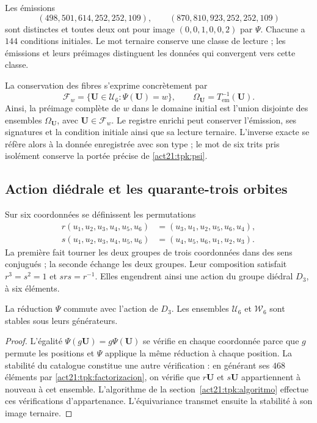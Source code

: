 \begin{example}
\label{act21:tpk:colision}
Les émissions
\[
 (498,501,614,252,252,109),\qquad
 (870,810,923,252,252,109)
\]
sont distinctes et toutes deux ont pour image \((0,0,1,0,0,2)\) par \(\Psi\).
Chacune a \(144\) conditions initiales. Le mot ternaire conserve
une classe de lecture ; les émissions et leurs préimages distinguent les données
qui convergent vers cette classe.
\end{example}

La conservation des fibres s'exprime concrètement par
\[
 \mathcal F_w=\{\mathbf U\in\mathcal U_6:\Psi(\mathbf U)=w\},
 \qquad
 \Omega_{\mathbf U}=T_{\mathrm{em}}^{-1}(\mathbf U).
\]
Ainsi, la préimage complète de \(w\) dans le domaine initial est l'union disjointe des ensembles \(\Omega_{\mathbf U}\), avec \(\mathbf U\in\mathcal F_w\). Le registre enrichi peut conserver l'émission, ses signatures et la condition initiale ainsi que sa lecture ternaire. L'inverse exacte se réfère alors à la donnée enregistrée avec son type ; le mot de six trits pris isolément conserve la portée précise de \eqref{act21:tpk:psi}.

\subsection{Action diédrale et les quarante-trois orbites}
\label{act21:tpk:orbitas}

Sur six coordonnées se définissent les permutations
\begin{align}
 r(u_1,u_2,u_3,u_4,u_5,u_6)
   &=(u_3,u_1,u_2,u_5,u_6,u_4),\\
 s(u_1,u_2,u_3,u_4,u_5,u_6)
   &=(u_4,u_5,u_6,u_1,u_2,u_3).
 \label{act21:tpk:generadores-diedrales}
\end{align}
La première fait tourner les deux groupes de trois coordonnées dans des sens conjugués ;
la seconde échange les deux groupes. Leur composition satisfait
\(r^3=s^2=1\) et \(srs=r^{-1}\). Elles engendrent ainsi une action du groupe diédral
\(D_3\), à six éléments.

\begin{proposition}
\label{act21:tpk:equivarianza}
La réduction \(\Psi\) commute avec l'action de \(D_3\). Les ensembles
\(\mathcal U_6\) et \(\mathcal W_6\) sont stables sous leurs générateurs.
\end{proposition}
\begin{proof}
L'égalité \(\Psi(g\mathbf U)=g\Psi(\mathbf U)\) se vérifie en chaque
coordonnée parce que \(g\) permute les positions et \(\Psi\) applique la même
réduction à chaque position. La stabilité du catalogue constitue une autre
vérification : en générant ses \(468\) éléments par
\eqref{act21:tpk:factorizacion}, on vérifie que \(r\mathbf U\) et
\(s\mathbf U\) appartiennent à nouveau à cet ensemble. L'algorithme de la
section~\ref{act21:tpk:algoritmo} effectue ces vérifications d'appartenance.
L'équivariance transmet ensuite la stabilité à son image ternaire.
\end{proof}

